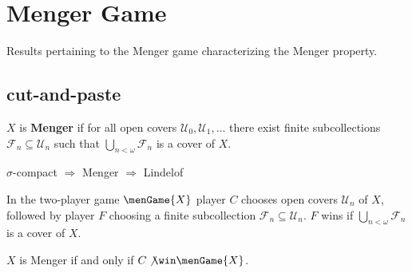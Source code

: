 
\chapter{Menger Game}

Results pertaining to the Menger game characterizing the Menger property.

\section{cut-and-paste}


  \begin{defn}
    $X$ is \textbf{Menger} if for all open covers $\mathcal{U}_0,\mathcal{U}_1,\dots$ there exist finite subcollections $\mathcal{F}_n \subseteq \mathcal{U}_n$ such that $\bigcup_{n<\omega} \mathcal{F}_n$ is a cover of $X$.
  \end{defn}

  \begin{prop}
    $\sigma$-compact $\Rightarrow$ Menger $\Rightarrow$ Lindelof
  \end{prop}

  \begin{defn}
    In the two-player game $\menGame{X}$ player $C$ chooses open covers $\mathcal{U}_n$ of $X$, followed by player $F$ choosing a finite subcollection $\mathcal{F}_n\subseteq\mathcal{U}_n$. $F$ wins if $\bigcup_{n<\omega} \mathcal{F}_n$ is a cover of $X$.
  \end{defn}

  \begin{thm}
    $X$ is Menger if and only if $C \not\win \menGame{X}$.
  \end{thm}

